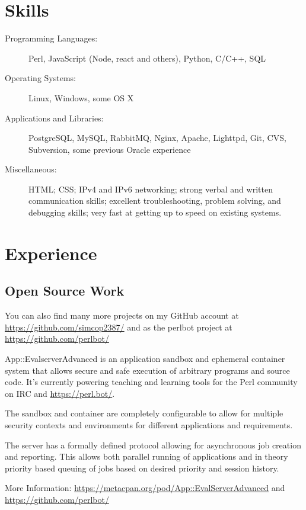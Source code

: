 \documentclass[table,tmargin=1in,bmargin=1in,letterpaper]{resume}
\author{Ryan Voots}
\begin{document}
\maketitle
\vspace{0.1in}

\section{Skills}
\begin{description}
\item[Programming Languages:]
Perl, JavaScript (Node, react and others), Python, C/C++, SQL
\item[Operating Systems:]
Linux, Windows, some OS X
\item[Applications and Libraries:]
PostgreSQL, MySQL, RabbitMQ, Nginx, Apache, Lighttpd, Git, CVS, Subversion, some previous Oracle experience
\item[Miscellaneous:]
HTML; CSS; IPv4 and IPv6 networking; strong verbal and written communication skills; excellent troubleshooting, problem solving, and debugging skills; very fast at getting up to speed on existing systems.
\end{description}

\section{Experience}

\subsection{Open Source Work}

\begin{compactitem}
\item You can also find many more projects on my GitHub account at \url{https://github.com/simcop2387/} and as the perlbot project at \url{https://github.com/perlbot/}
\end{compactitem}

\begin{compactitem}
\item App::EvalserverAdvanced is an application sandbox and ephemeral container system that allows secure and safe execution of arbitrary programs and source code.  It's currently powering teaching and learning tools for the Perl community on IRC and \url{https://perl.bot/}. 
\item The sandbox and container are completely configurable to allow for multiple security contexts and environments for different applications and requirements.
\item The server has a formally defined protocol allowing for asynchronous job creation and reporting.  This allows both parallel running of applications and in theory priority based queuing of jobs based on desired priority and session history.
\item More Information: \url{https://metacpan.org/pod/App::EvalServerAdvanced} and \url{https://github.com/perlbot/}
\end{compactitem}
\end{document}
